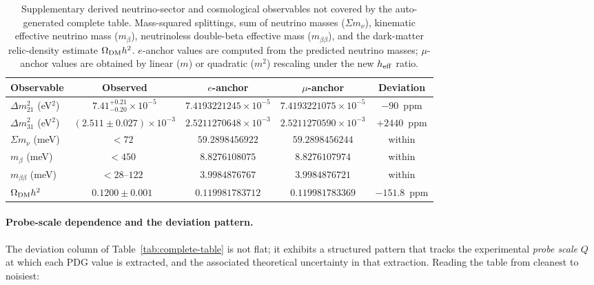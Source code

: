 ﻿\documentclass[reprint,amsmath,amssymb,aps,prd,longbibliography,floatfix]{revtex4-2}
\begin{document}
\begin{table}[t]
\centering
\caption{Supplementary derived neutrino-sector and cosmological observables not covered by the auto-generated complete table. Mass-squared splittings, sum of neutrino masses ($\Sigma m_\nu$), kinematic effective neutrino mass ($m_\beta$), neutrinoless double-beta effective mass ($m_{\beta\beta}$), and the dark-matter relic-density estimate $\Omega_{\rm DM} h^2$. $e$-anchor values are computed from the predicted neutrino masses; $\mu$-anchor values are obtained by linear ($m$) or quadratic ($m^2$) rescaling under the new $h_{\rm eff}$ ratio.}
\label{tab:supplementary}
\begin{ruledtabular}
\begin{tabular}{lcccc}
Observable & Observed & $e$-anchor & $\mu$-anchor & Deviation \\
\hline
$\Delta m^2_{21}$ (eV$^2$) & $7.41^{+0.21}_{-0.20} \times 10^{-5}$ & $7.4193221245 \times 10^{-5}$ & $7.4193221075 \times 10^{-5}$ & $-90$~ppm \\
$\Delta m^2_{31}$ (eV$^2$) & $(2.511 \pm 0.027) \times 10^{-3}$ & $2.5211270648 \times 10^{-3}$ & $2.5211270590 \times 10^{-3}$ & $+2440$~ppm \\
$\Sigma m_\nu$ (meV)   & $< 72$~\cite{DESI2024}   & $59.2898456922$ & $59.2898456244$ & within \\
$m_\beta$ (meV)        & $< 450$~\cite{KATRIN2024} & $8.8276108075$ & $8.8276107974$ & within \\
$m_{\beta\beta}$ (meV) & $< 28$--$122$~\cite{KamLANDZen2024} & $3.9984876767$ & $3.9984876721$ & within \\
$\Omega_{\rm DM} h^2$ & $0.1200 \pm 0.001$~\cite{Planck2018} & $0.119981783712$ & $0.119981783369$ & $-151.8$~ppm \\
\end{tabular}
\end{ruledtabular}
\end{table}

\paragraph{Probe-scale dependence and the deviation pattern.}
The deviation column of Table~\ref{tab:complete-table} is not flat; it
exhibits a structured pattern that tracks the experimental
\emph{probe scale} $Q$ at which each PDG value is extracted, and
the associated theoretical uncertainty in that extraction. Reading
the table from cleanest to noisiest:
\end{document}
